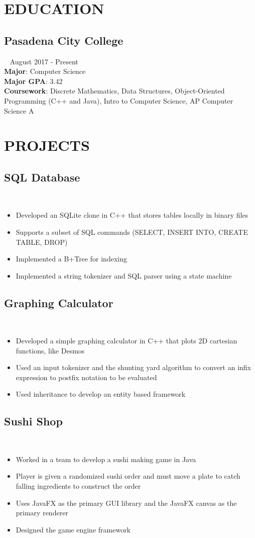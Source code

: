 \documentclass{article}
\newcommand{\resumesection}[3]{
    \subsection*{#1}
    \ 
    \footnotesize
    \textcolor{wordgrey}{#2}
    \normalsize
    \hfill
    \textcolor{wordgrey}{#3}
}
\begin{document}
\pagestyle{useheader}

\section*{EDUCATION}
\resumesection{Pasadena City College}{}{August 2017 - Present}\\
\textbf{Major}: Computer Science\\
\textbf{Major GPA}: 3.42\\
\textbf{Coursework}: Discrete Mathematics, Data Structures, Object-Oriented Programming (C++ and Java), Intro to Computer Science, AP Computer Science A


\section*{PROJECTS}
\resumesection{SQL Database}{}{}
\begin{itemize}
    \item Developed an SQLite clone in C++ that stores tables locally in binary files
    \item Supports a subset of SQL commands (SELECT, INSERT INTO, CREATE TABLE, DROP) 
    \item Implemented a B+Tree for indexing
    \item Implemented a string tokenizer and SQL parser using a state machine
\end{itemize}

\resumesection{Graphing Calculator}{}{}
\begin{itemize}
    \item Developed a simple graphing calculator in C++ that plots 2D cartesian functions, like Desmos
    \item Used an input tokenizer and the shunting yard algorithm to convert an infix expression to postfix notation to be evaluated
    \item Used inheritance to develop an entity based framework
\end{itemize}

\resumesection{Sushi Shop}{}{}
\begin{itemize}
    \item Worked in a team to develop a sushi making game in Java
    \item Player is given a randomized sushi order and must move a plate to catch falling ingredients to construct the order
    \item Uses JavaFX as the primary GUI library and the JavaFX canvas as the primary renderer 
    \item Designed the game engine framework
\end{itemize}
\end{document}
